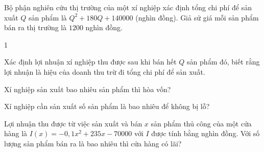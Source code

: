 \begin{bt}%
	Bộ phận nghiên cứu thị trường của một xí nghiệp xác định tổng chi phí để sản xuất $Q$ sản phẩm là $Q^2+180Q+140000$ (nghìn đồng). Giả sử giá mỗi sản phẩm bán ra thị trường là $1200$ nghìn đồng.
	\begin{enumEX}[a)]{1}
		\item Xác định lợi nhuận xí nghiệp thu được sau khi bán hết $Q$ sản phẩm đó, biết rằng lợi nhuận là hiệu của doanh thu trừ đi tổng chi phí để sản xuất.
		\item Xí nghiệp sản xuất bao nhiêu sản phẩm thì hòa vốn?
		\item Xí nghiệp cần sản xuất số sản phẩm là bao nhiêu để không bị lỗ?
	\end{enumEX}
\end{bt}

\begin{bt}%
	Lợi nhuận thu được từ việc sản xuất và bán $x$ sản phẩm thủ công của một cửa hàng là 
	$I(x)=-0{,}1x^2+235x-70000$ với $I$ được tính bằng nghìn đồng. Với số lượng sản phẩm bán ra là bao nhiêu thì cửa hàng có lãi?
\end{bt}

